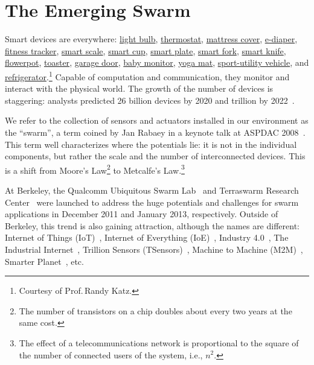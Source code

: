\section{The Emerging Swarm}
\label{sec:emerging-swarm}

Smart devices are everywhere: \href{http://ilumi.co/}{light bulb},
\href{https://nest.com/}{thermostat}, \href{http://lunasleep.com/}{mattress
  cover}, \href{https://www.indiegogo.com/projects/smart-diapers}{e-diaper},
\href{https://www.fitbit.com/}{fitness tracker},
\href{https://www.fitbit.com/aria}{smart scale},
\href{https://www.myvessyl.com/}{smart cup},
\href{https://www.kickstarter.com/projects/1816678675/smartplate-instantly-track-and-analyze-everything}{smart
  plate},
\href{http://www.amazon.com/HAPILABS-102-HAPIfork-Bluetooth-Enabled-Smart/dp/B00FRPCPEC}{smart
  fork}, \href{http://electroluxdesignlab.com/en/submission/smart-knife/}{smart
  knife},
\href{http://www.clickandgrow.com/pages/what-is-click-grow}{flowerpot},
\href{http://www.williams-sonoma.com/products/breville-die-cast-2-slice-stainless-steel-smart-toaster/}{toaster},
\href{https://garageio.com/}{garage door},
\href{http://www2.withings.com/us/en/products/baby/smart-baby-monitor}{baby
  monitor},
\href{https://www.indiegogo.com/projects/smartmat-the-world-s-first-intelligent-yoga-mat}{yoga
  mat},
\href{http://usnews.rankingsandreviews.com/cars-trucks/best-cars-blog/2013/02/2015_GM_Vehicles_Will_Get_Wi-Fi_Internet_Access/}{sport-utility
  vehicle}, and
\href{http://www.samsung.com/us/appliances/refrigerators/RF28HMELBSR/AA}{refrigerator}.\footnote{Courtesy
  of Prof.\,Randy Katz.} Capable of computation and communication, they monitor
and interact with the physical world.  The growth of the number of devices is
staggering: analysts predicted 26 billion devices by 2020 and trillion by
2022~\cite{middleton2013forecast}.

We refer to the collection of sensors and actuators installed in our environment
as the ``swarm'', a term coined by Jan Rabaey in a keynote talk at ASPDAC
2008~\cite{rabaey2008brand}. This term well characterizes where the potentials
lie: it is not in the individual components, but rather the scale and the number
of interconnected devices. This is a shift from Moore's Law\footnote{The number
  of transistors on a chip doubles about every two years at the same cost.} to
Metcalfe's Law.\footnote{The effect of a telecommunications network is
  proportional to the square of the number of connected users of the system,
  i.e., $n^2$.}

At Berkeley, the Qualcomm Ubiquitous Swarm Lab~\cite{swarmlab} and Terraswarm
Research Center~\cite{terraswarm} were launched to address the huge potentials
and challenges for swarm applications in December 2011 and January 2013,
respectively. Outside of Berkeley, this trend is also gaining attraction,
although the names are different: Internet of Things
(IoT)~\cite{atzori2010internet}, Internet of Everything
(IoE)~\cite{bradley2013internet}, Industry 4.0~\cite{lasi2014industry}, The
Industrial Internet~\cite{eigner2018industrial}, Trillion Sensors
(TSensors)~\cite{bogue2014towards}, Machine to Machine
(M2M)~\cite{anton2014machine}, Smarter Planet~\cite{palmisano2008smarter}, etc.

